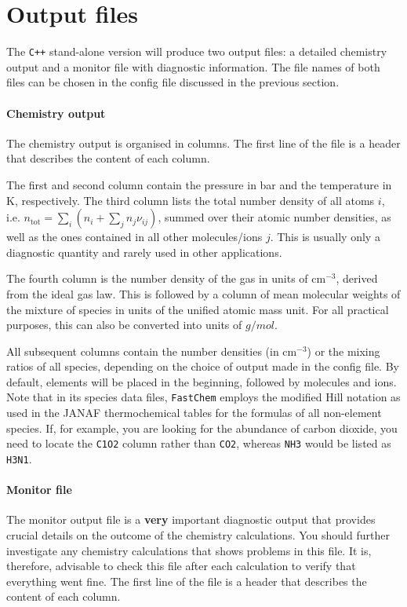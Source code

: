 \documentclass[numbers=noenddot]{aux/fcmanual}
\newcommand{\fc}{\texttt{FastChem}\xspace}
\newcommand{\cpp}{\ttt{C++}\xspace}
\newcommand{\ttt}[1]{\texttt {#1}}
\begin{document}
\section{Output files}
\label{sec:fc_cpp_output}

The \cpp stand-alone version will produce two output files: a detailed chemistry output and a monitor file with diagnostic information. The file names of both files can be chosen in the config file discussed in the previous section.

\paragraph{Chemistry output} 
The chemistry output is organised in columns. The first line of the file is a header that describes the content of each column.

The first and second column contain the pressure in bar and the temperature in K, respectively. The third column lists the total number density of all atoms $i$, i.e. $n_\mathrm{tot} = \sum_i \left( n_i + \sum_j n_j \nu_{ij} \right)$, summed over their atomic number densities, as well as the ones contained in all other molecules/ions $j$. This is usually only a diagnostic quantity and rarely used in other applications. 

The fourth column is the number density of the gas in units of cm$^{-3}$, derived from the ideal gas law. This is followed by a column of mean molecular weights of the mixture of species in units of the unified atomic mass unit. For all practical purposes, this can also be converted into units of $\unit{g/mol}$.

All subsequent columns contain the number densities (in cm$^{-3}$) or the mixing ratios of all species, depending on the choice of output made in the config file. By default, elements will be placed in the beginning, followed by molecules and ions. Note that in its species data files, \fc employs the modified Hill notation as used in the JANAF thermochemical tables \citep{Chase1986jtt..book.....C} for the formulas of all non-element species. If, for example, you are looking for the abundance of carbon dioxide, you need to locate the \verb|C1O2| column rather than \verb|CO2|, whereas \verb|NH3| would be listed as \verb|H3N1|.

\paragraph{Monitor file} The monitor output file is a \textbf{very} important diagnostic output that provides crucial details on the outcome of the chemistry calculations. You should further investigate any chemistry calculations that shows problems in this file. It is, therefore, advisable to check this file after each calculation to verify that everything went fine. The first line of the file is a header that describes the content of each column.
\end{document}
